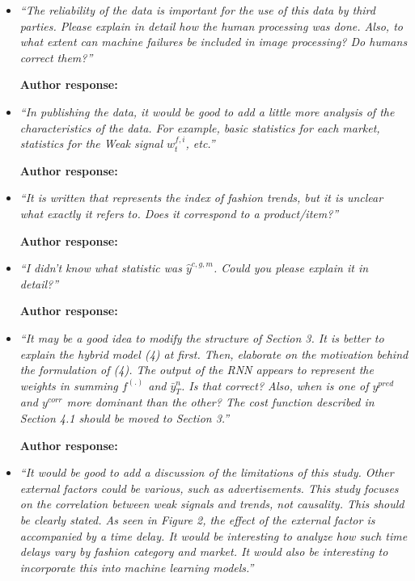 \documentclass[10pt]{article} %
\begin{document}
\begin{itemize}
	\item {\em ``The reliability of the data is important for the use of this data by third parties. Please explain in detail how the human processing was done. Also, to what extent can machine failures be included in image processing? Do humans correct them?''} \medskip
	
	\textbf{Author response:} \\
	
	\item {\em ``In publishing the data, it would be good to add a little more analysis of the characteristics of the data. For example, basic statistics for each market, statistics for the Weak signal $w^{f,i}_t$, etc.''} \medskip
	
	\textbf{Author response:} \\
	
	\item {\em ``It is written that represents the index of fashion trends, but it is unclear what exactly it refers to. Does it correspond to a product/item?''} \medskip

	\textbf{Author response:}\\
	
	\item {\em ``I didn't know what statistic was $\hat{y}^{c,g,m}$. Could you please explain it in detail?''} \medskip

	\textbf{Author response:}\\	

	\item {\em ``It may be a good idea to modify the structure of Section 3. It is better to explain the hybrid model (4) at first.  Then, elaborate on the motivation behind the formulation of (4). The output of the RNN appears to represent the weights in summing $f^(.)$ and $\bar{y}^n_{T}$. Is that correct? Also, when is one of $y^{pred}$ and $y^{corr}$ more dominant than the other? The cost function described in Section 4.1 should be moved to Section 3.''} \medskip

	\textbf{Author response:}\\	

	\item {\em ``It would be good to add a discussion of the limitations of this study. Other external factors could be various, such as advertisements. This study focuses on the correlation between weak signals and trends, not causality. This should be clearly stated. As seen in Figure 2, the effect of the external factor is accompanied by a time delay. It would be interesting to analyze how such time delays vary by fashion category and market. It would also be interesting to incorporate this into machine learning models.''} \medskip


\end{itemize}
\end{document}
